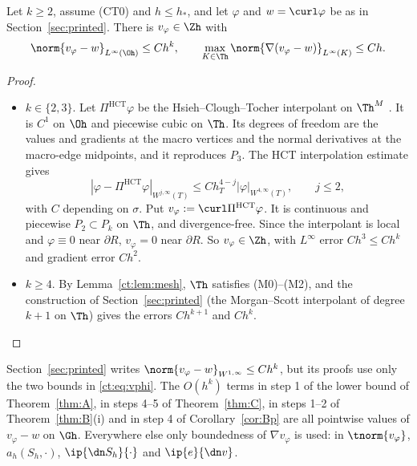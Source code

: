 \begin{lemma}\label{ct:lem:vphi}
Let $k\ge2$, assume (CT0) and $h\le h_\ast$, and let $\varphi$ and $w=\curl\varphi$ be as in Section~\ref{sec:printed}. There is $v_\varphi\in\Zh$ with
\begin{equation}\label{ct:eq:vphi}
\norm{v_\varphi-w}_{L^\infty(\Oh)}\le Ch^k,\qquad\max_{K\in\Th}\norm{\nabla(v_\varphi-w)}_{L^\infty(K)}\le Ch .
\end{equation}
\end{lemma}

\begin{proof}
\begin{itemize}
\item $k\in\{2,3\}$. Let $\Pi^{\mathrm{HCT}}\varphi$ be the Hsieh--Clough--Tocher interpolant on $\Th^M$ \cite{CloughTocher1965}. It is $C^1$ on $\Oh$ and piecewise cubic on $\Th$. Its degrees of freedom are the values and gradients at the macro vertices and the normal derivatives at the macro-edge midpoints, and it reproduces $P_3$. The HCT interpolation estimate \cite[Section 6.1]{Ciarlet1978book} gives
\[
|\varphi-\Pi^{\mathrm{HCT}}\varphi|_{W^{j,\infty}(T)}\le Ch_T^{4-j}|\varphi|_{W^{4,\infty}(T)},\qquad j\le2,
\]
with $C$ depending on $\sigma$. Put $v_\varphi:=\curl\Pi^{\mathrm{HCT}}\varphi$. It is continuous and piecewise $P_2\subset P_k$ on $\Th$, and divergence-free. Since the interpolant is local and $\varphi\equiv0$ near $\partial R$, $v_\varphi=0$ near $\partial R$. So $v_\varphi\in\Zh$, with $L^\infty$ error $Ch^3\le Ch^k$ and gradient error $Ch^2$.
\item $k\ge4$. By Lemma~\ref{ct:lem:mesh}, $\Th$ satisfies (M0)--(M2), and the construction of Section~\ref{sec:printed} (the Morgan--Scott interpolant of degree $k+1$ \cite{MorganScott1975} on $\Th$) gives the errors $Ch^{k+1}$ and $Ch^k$.\qedhere
\end{itemize}
\end{proof}

Section~\ref{sec:printed} writes $\norm{v_\varphi-w}_{W^{1,\infty}}\le Ch^k$, but its proofs use only the two bounds in \eqref{ct:eq:vphi}. The $O(h^k)$ terms in step 1 of the lower bound of Theorem~\ref{thm:A}, in steps 4--5 of Theorem~\ref{thm:C}, in steps 1--2 of Theorem~\ref{thm:B}(i) and in step 4 of Corollary~\ref{cor:Bp} are all pointwise values of $v_\varphi-w$ on $\Gh$. Everywhere else only boundedness of $\nabla v_\varphi$ is used: in $\tnorm{v_\varphi}$, $a_h(S_h,\cdot)$, $\ip{\dn S_h}{\cdot}$ and $\ip{e}{\dn v}$.


